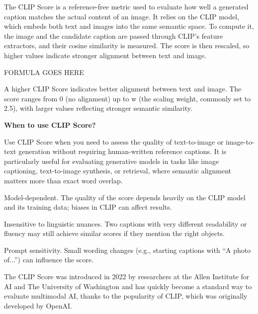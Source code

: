 
The CLIP Score is a reference-free metric used to evaluate how well a generated caption matches the
actual content of an image. It relies on the CLIP model, which embeds both text and images into the same semantic space. To compute it,
the image and the candidate caption are passed through CLIP’s feature extractors, and their cosine similarity is measured. The score is then
rescaled, so higher values indicate stronger alignment between text and image.

\begin{center}
    FORMULA GOES HERE
\end{center}

A higher CLIP Score indicates better alignment between text and image. The score ranges from 0 (no alignment) up to w (the scaling weight,
commonly set to 2.5), with larger values reflecting stronger semantic similarity.

\textbf{When to use CLIP Score?}

Use CLIP Score when you need to assess the quality of text-to-image or image-to-text generation without requiring human-written reference captions.
It is particularly useful for evaluating generative models in tasks like image captioning, text-to-image synthesis, or retrieval,
where semantic alignment matters more than exact word overlap.

{
\item Model-dependent. The quality of the score depends heavily on the CLIP model and its training data; biases in CLIP can affect results.
\item Insensitive to linguistic nuances. Two captions with very different readability or fluency may still achieve similar scores
if they mention the right objects.
\item Prompt sensitivity. Small wording changes (e.g., starting captions with “A photo of...”) can influence the score.
}

\clearpage

\thispagestyle{customstyle}

{The CLIP Score was introduced in 2022 by researchers at the Allen Institute for AI and The University of Washington and has quickly become a
standard way to evaluate multimodal AI, thanks to the popularity of CLIP, which was originally developed by OpenAI.}